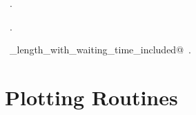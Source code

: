 \documentclass[11.5pt]{report}
\begin{document}
\begin{flushleft}
\vspace{-1.5ex}
\footnotesize
\begin{list}{}{\setlength{\itemsep}{-\parsep}\setlength{\itemindent}{-\leftmargin}}
\item \NWtxtMacroDefBy\ .
\item \NWtxtMacroRefIn\ .
\item \NWtxtIdentsDefed\nobreak\  \verb@tour_length_with_waiting_time_included@\nobreak\ .
\item{}
\end{list}
\vspace{4ex}
\end{flushleft}
\section{Plotting Routines}
\newchunk 
\end{document}

